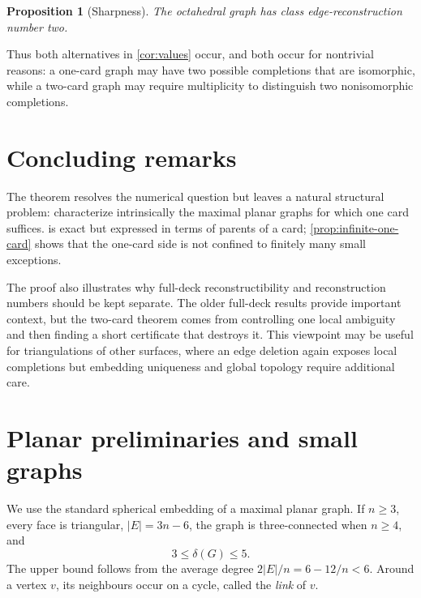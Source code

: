 \documentclass[11pt]{article}
\newtheorem{proposition}[theorem]{Proposition}
\theoremstyle{definition}
\theoremstyle{remark}
\begin{document}
\begin{proposition}[Sharpness]\label{prop:octahedron}
The octahedral graph has class edge-reconstruction number two.
\end{proposition}

Thus both alternatives in \cref{cor:values} occur, and both occur for
nontrivial reasons: a one-card graph may have two possible completions that
are isomorphic, while a two-card graph may require multiplicity to distinguish
two nonisomorphic completions.

\FloatBarrier
\section{Concluding remarks}

The theorem resolves the numerical question but leaves a natural structural
problem: characterize intrinsically the maximal planar graphs for which one
card suffices.   is exact but expressed in terms of
parents of a card; \cref{prop:infinite-one-card} shows that the one-card side
is not confined to finitely many small exceptions.

The proof also illustrates why full-deck reconstructibility and
reconstruction numbers should be kept separate.  The older full-deck results
provide important context, but the two-card theorem comes from controlling
one local ambiguity and then finding a short certificate that destroys it.
This viewpoint may be useful for triangulations of other surfaces, where an
edge deletion again exposes local completions but embedding uniqueness and
global topology require additional care.

\clearpage
\nocite{*}



\clearpage
\appendix

\section{Planar preliminaries and small graphs}\label{app:preliminaries}

We use the standard spherical embedding of a maximal planar graph.  If
\(n\ge3\), every face is triangular, \(|E|=3n-6\), the graph is
three-connected when \(n\ge4\), and
\[
                  3\le \delta(G)\le5.
\]
The upper bound follows from the average degree
\(2|E|/n=6-12/n<6\).  Around a vertex \(v\), its neighbours occur on a
cycle, called the \emph{link} of \(v\).
\end{document}
